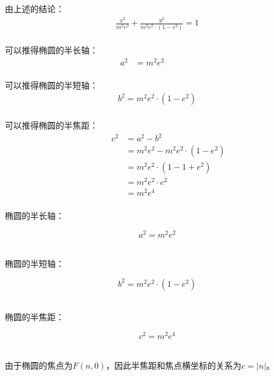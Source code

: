 \documentclass[UTF8]{ctexart}
\begin{document}
    由上述的结论：
    \begin{align}
        \frac{x^2}{m^2e^2}+\frac{y^2}{m^2e^2\cdot\left(1-e^2\right)}=1
    \end{align}\\
    可以推得椭圆的半长轴：
    \begin{align}
        a^2&=m^2e^2~~~~~~~~~~~~~~~~
    \end{align}\\
    可以推得椭圆的半短轴：
    \begin{align}
        b^2=m^2e^2\cdot\left(1-e^2\right)
    \end{align}\\
    可以推得椭圆的半焦距：
    \begin{align}
        ~~~~~~~~~~~~c^2&=a^2-b^2\\[5mm]
        &=m^2e^2-m^2e^2\cdot\left(1-e^2\right)\\[5mm]
        &=m^2e^2\cdot\left(1-1+e^2\right)\\[5mm]
        &=m^2e^2\cdot e^2\\[5mm]
        &=m^2e^4
    \end{align}\\
    椭圆的半长轴：
    \begin{large}
        \begin{equation*}
            a^2=m^2e^2
        \end{equation*}
    \end{large}\\
    椭圆的半短轴：
    \begin{large}
        \begin{equation*}
            b^2=m^2e^2\cdot\left(1-e^2\right)
        \end{equation*}
    \end{large}\\
    椭圆的半焦距：
    \begin{large}
        \begin{equation*}
            c^2=m^2e^4
        \end{equation*}
    \end{large}\\
    由于椭圆的焦点为$F(n,0)$，因此半焦距和焦点横坐标的关系为$c=|n|$。

\newpage
\end{document}
